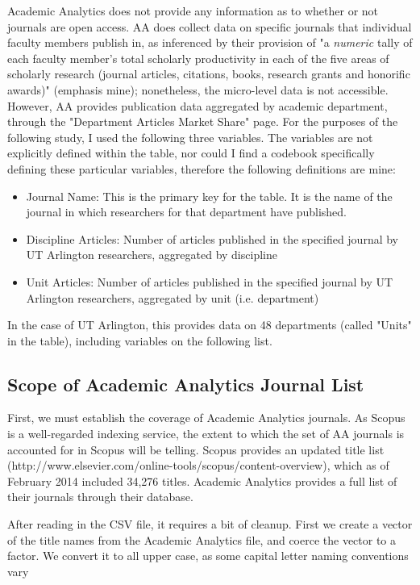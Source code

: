 \documentclass{article}
\begin{document}
Academic Analytics does not provide any information as to whether or not journals are open access. 
AA does collect data on specific journals that individual faculty members publish in, as inferenced by their provision of "a \textit{numeric} tally of each faculty member’s total scholarly productivity in each of the five areas of scholarly research (journal articles, citations, books, research grants and honorific awards)" (emphasis mine); nonetheless, the micro-level data is not accessible. 
However, AA provides publication data aggregated by academic department, through the "Department Articles Market Share" page. 
For the purposes of the following study, I used the following three variables.                             
The variables are not explicitly defined within the table, nor could I find a codebook specifically defining these particular variables, therefore the following definitions are mine:
\begin{itemize}
\item Journal Name: This is the primary key for the table. It is the name of the journal in which researchers for that department have published.
\item Discipline Articles: Number of articles published in the specified journal by UT Arlington researchers, aggregated by discipline
\item Unit Articles: Number of articles published in the specified journal by UT Arlington researchers, aggregated by unit (i.e. department)
\end{itemize}

 In the case of UT Arlington, this provides data on 48 departments (called "Units" in the table), including variables on the following list. 


\subsection{Scope of Academic Analytics Journal List}
First, we must establish the coverage of Academic Analytics journals. 
As Scopus is a well-regarded indexing service, the extent to which the set of AA journals is accounted for in Scopus will be telling.
Scopus provides an updated title list (http://www.elsevier.com/online-tools/scopus/content-overview), which as of February 2014 included 34,276 titles. 
Academic Analytics provides a full list of their journals through their database.

After reading in the CSV file, it requires a bit of cleanup. First we create a vector of the title names from the Academic Analytics file, and coerce the vector to a factor. We convert it to all upper case, as some capital letter naming conventions vary 
\end{document}
